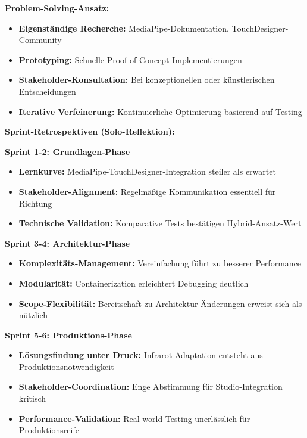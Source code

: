 \textbf{Problem-Solving-Ansatz:}
\begin{itemize}
    \item \textbf{Eigenständige Recherche:} MediaPipe-Dokumentation, TouchDesigner-Community
    \item \textbf{Prototyping:} Schnelle Proof-of-Concept-Implementierungen
    \item \textbf{Stakeholder-Konsultation:} Bei konzeptionellen oder künstlerischen Entscheidungen
    \item \textbf{Iterative Verfeinerung:} Kontinuierliche Optimierung basierend auf Testing
\end{itemize}

\textbf{Sprint-Retrospektiven (Solo-Reflektion):}

\textbf{Sprint 1-2: Grundlagen-Phase}
\begin{itemize}
    \item \textbf{Lernkurve:} MediaPipe-TouchDesigner-Integration steiler als erwartet
    \item \textbf{Stakeholder-Alignment:} Regelmäßige Kommunikation essentiell für Richtung
    \item \textbf{Technische Validation:} Komparative Tests bestätigen Hybrid-Ansatz-Wert
\end{itemize}

\textbf{Sprint 3-4: Architektur-Phase}
\begin{itemize}
    \item \textbf{Komplexitäts-Management:} Vereinfachung führt zu besserer Performance
    \item \textbf{Modularität:} Containerization erleichtert Debugging deutlich
    \item \textbf{Scope-Flexibilität:} Bereitschaft zu Architektur-Änderungen erweist sich als nützlich
\end{itemize}

\textbf{Sprint 5-6: Produktions-Phase}
\begin{itemize}
    \item \textbf{Lösungsfindung unter Druck:} Infrarot-Adaptation entsteht aus Produktionsnotwendigkeit
    \item \textbf{Stakeholder-Coordination:} Enge Abstimmung für Studio-Integration kritisch
    \item \textbf{Performance-Validation:} Real-world Testing unerlässlich für Produktionsreife
\end{itemize}